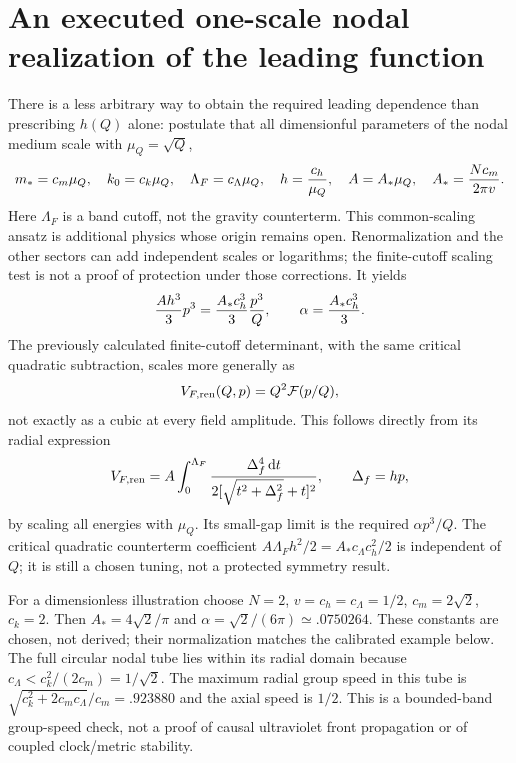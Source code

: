 \documentclass[11pt]{article}
\newcommand{\dd}{\mathrm d}
\begin{document}
\section{An executed one-scale nodal realization of the leading function}
There is a less arbitrary way to obtain the required leading dependence
than prescribing $h(Q)$ alone: postulate that all dimensionful parameters
of the nodal medium scale with $\mu_Q=\sqrt Q$,
\begin{equation}
 m_*=c_m\mu_Q,\quad k_0=c_k\mu_Q,\quad
 \Lambda_F=c_\Lambda\mu_Q,\quad h={c_h\over\mu_Q},\quad
 A=A_*\mu_Q,\quad A_*={Nc_m\over2\pi v}.
\end{equation}
Here $\Lambda_F$ is a band cutoff, not the gravity counterterm. This
common-scaling ansatz is additional physics whose origin remains open.
Renormalization and the other sectors can add independent scales or
logarithms; the finite-cutoff scaling test is not a proof of protection
under those corrections.
It yields
\begin{equation}
 {A h^3\over3}p^3={A_*c_h^3\over3}{p^3\over Q},\qquad
 \alpha={A_*c_h^3\over3}.
\end{equation}
The previously calculated finite-cutoff determinant, with the same critical
quadratic subtraction, scales more generally as
\begin{equation}
 V_{F,\rm ren}(Q,p)=Q^2\mathcal F(p/Q),
\end{equation}
not exactly as a cubic at every field amplitude. This follows directly
from its radial expression
\begin{equation}
 V_{F,\rm ren}=A\int_0^{\Lambda_F}
 {\Delta_f^4\,\dd t\over2[\sqrt{t^2+\Delta_f^2}+t]^2},\qquad
 \Delta_f=hp,
\end{equation}
by scaling all energies with $\mu_Q$. Its small-gap limit is the required
$\alpha p^3/Q$. The critical quadratic counterterm coefficient
$A\Lambda_Fh^2/2=A_*c_\Lambda c_h^2/2$ is independent of $Q$;
it is still a chosen tuning, not a protected symmetry result.

For a dimensionless illustration choose
$N=2$, $v=c_h=c_\Lambda=1/2$, $c_m=2\sqrt2$, $c_k=2$.
Then $A_*=4\sqrt2/\pi$ and
$\alpha=\sqrt2/(6\pi)\simeq.0750264$. These constants are chosen, not
derived; their normalization matches the calibrated example below.
The full circular nodal tube lies within its radial domain because
$c_\Lambda<c_k^2/(2c_m)=1/\sqrt2$.
The maximum radial group speed in this tube is
$\sqrt{c_k^2+2c_mc_\Lambda}/c_m=.923880$ and the axial speed is $1/2$.
This is a bounded-band group-speed check, not a proof of causal ultraviolet
front propagation or of coupled clock/metric stability.
\end{document}
